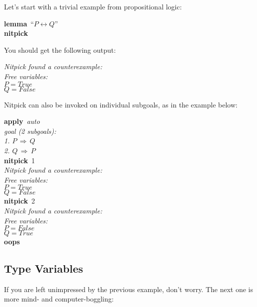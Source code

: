 \documentclass[a4paper,12pt]{article}
\begin{document}
Let's start with a trivial example from propositional logic:

\prew
\textbf{lemma}~``$P \longleftrightarrow Q$'' \\
\textbf{nitpick}
\postw

You should get the following output:

\prew
\slshape
Nitpick found a counterexample: \\[2\smallskipamount]
\hbox{}\qquad Free variables: \nopagebreak \\
\hbox{}\qquad\qquad $P = \textit{True}$ \\
\hbox{}\qquad\qquad $Q = \textit{False}$
\postw


Nitpick can also be invoked on individual subgoals, as in the example below:

\prew
\textbf{apply}~\textit{auto} \\[2\smallskipamount]
{\slshape goal (2 subgoals): \\
\phantom{0}1. $P\,\Longrightarrow\, Q$ \\
\phantom{0}2. $Q\,\Longrightarrow\, P$} \\[2\smallskipamount]
\textbf{nitpick}~1 \\[2\smallskipamount]
{\slshape Nitpick found a counterexample: \\[2\smallskipamount]
\hbox{}\qquad Free variables: \nopagebreak \\
\hbox{}\qquad\qquad $P = \textit{True}$ \\
\hbox{}\qquad\qquad $Q = \textit{False}$} \\[2\smallskipamount]
\textbf{nitpick}~2 \\[2\smallskipamount]
{\slshape Nitpick found a counterexample: \\[2\smallskipamount]
\hbox{}\qquad Free variables: \nopagebreak \\
\hbox{}\qquad\qquad $P = \textit{False}$ \\
\hbox{}\qquad\qquad $Q = \textit{True}$} \\[2\smallskipamount]
\textbf{oops}
\postw

\subsection{Type Variables}
\label{type-variables}

If you are left unimpressed by the previous example, don't worry. The next
one is more mind- and computer-boggling:
\end{document}
